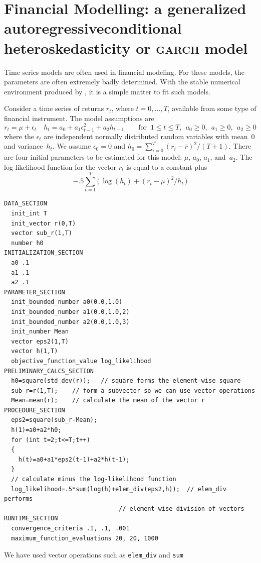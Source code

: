 \documentclass{admbmanual}
\begin{document}
\section{Financial Modelling: a generalized autoregressive\br conditional \hbox{heteroskedasticity} or \textsc{garch} model}

Time series models are often used in financial
modeling. For these models, the parameters are often extremely
badly determined. With the stable numerical environment
produced by \ADM, it is a simple matter to fit
such models.

Consider a time series of returns $r_t$, where $t=0,\ldots,T$,
available from some type of financial instrument.
The model assumptions are
    $$ r_t = \mu + \epsilon_t\quad
        h_t = a_0 + a_1\epsilon_{t-1}^2 + a_2h_{t-1}\qquad 
\textrm{for }\ 1\le t\le T,\ \ a_0\ge 0,\ \ a_1\ge 0,\ \ a_2\ge 0$$
where the $\epsilon_t$ are independent normally distributed random variables
with mean~0 and variance~$h_t$.
We assume $\epsilon_0=0$ and $h_0 = \sum_{i=0}^T(r_i-\bar r)^2/(T+1)$.
There are four initial parameters to be estimated for this model:
$\mu$, $a_0$, $a_1$, and~$a_2$.
The log-likelihood function for the vector $r_t$ is equal 
to a constant plus
$$-.5\sum_{t=1}^T\big(\,\log(h_t)+(r_t-\mu)^2/h_t\,\big)$$
\begin{lstlisting}
DATA_SECTION
  init_int T
  init_vector r(0,T)
  vector sub_r(1,T)
  number h0
INITIALIZATION_SECTION
  a0 .1
  a1 .1
  a2 .1
PARAMETER_SECTION
  init_bounded_number a0(0.0,1.0)
  init_bounded_number a1(0.0,1.0,2)
  init_bounded_number a2(0.0,1.0,3)
  init_number Mean
  vector eps2(1,T)
  vector h(1,T)
  objective_function_value log_likelihood
PRELIMINARY_CALCS_SECTION
  h0=square(std_dev(r));   // square forms the element-wise square 
  sub_r=r(1,T);    // form a subvector so we can use vector operations
  Mean=mean(r);    // calculate the mean of the vector r 
PROCEDURE_SECTION
  eps2=square(sub_r-Mean);   
  h(1)=a0+a2*h0;
  for (int t=2;t<=T;t++)
  {
    h(t)=a0+a1*eps2(t-1)+a2*h(t-1);
  }
  // calculate minus the log-likelihood function
  log_likelihood=.5*sum(log(h)+elem_div(eps2,h));  // elem_div performs  
                                // element-wise division of vectors
RUNTIME_SECTION
  convergence_criteria .1, .1, .001
  maximum_function_evaluations 20, 20, 1000
\end{lstlisting}
We have used vector operations such as \texttt{elem\_div} and \texttt{sum}
\end{document}
